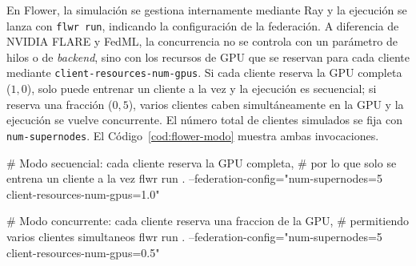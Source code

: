 En Flower, la simulación se gestiona internamente mediante Ray y la ejecución se lanza con
\texttt{flwr run}, indicando la configuración de la federación. A diferencia de NVIDIA FLARE y
FedML, la concurrencia no se controla con un parámetro de hilos o de \textit{backend}, sino con
los recursos de GPU que se reservan para cada cliente mediante
\texttt{client-resources-num-gpus}. Si cada cliente reserva la GPU completa ($1{,}0$), solo puede
entrenar un cliente a la vez y la ejecución es secuencial; si reserva una fracción ($0{,}5$),
varios clientes caben simultáneamente en la GPU y la ejecución se vuelve concurrente. El número
total de clientes simulados se fija con \texttt{num-supernodes}. El Código~\ref{cod:flower-modo}
muestra ambas invocaciones.

\begin{bashcodeNN}[title={Modos de ejecución en Flower}, label={cod:flower-modo}, list entry={\protect\numberline{\thelisting}Modos de ejecución en Flower}]
# Modo secuencial: cada cliente reserva la GPU completa,
# por lo que solo se entrena un cliente a la vez
flwr run . --federation-config="num-supernodes=5 client-resources-num-gpus=1.0"

# Modo concurrente: cada cliente reserva una fraccion de la GPU,
# permitiendo varios clientes simultaneos
flwr run . --federation-config="num-supernodes=5 client-resources-num-gpus=0.5"
\end{bashcodeNN}
